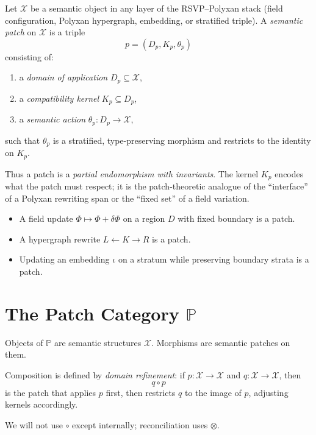\begin{definition}
Let $\mathcal{X}$ be a semantic object in any layer of the RSVP--Polyxan stack
(field configuration, Polyxan hypergraph, embedding, or stratified triple).
A \emph{semantic patch} on $\mathcal{X}$ is a triple
\[
p = (D_p, K_p, \theta_p)
\]
consisting of:
\begin{enumerate}
\item a \emph{domain of application} $D_p\subseteq\mathcal{X}$,
\item a \emph{compatibility kernel} $K_p\subseteq D_p$,
\item a \emph{semantic action} $\theta_p : D_p\to \mathcal{X}$,
\end{enumerate}
such that $\theta_p$ is a stratified, type-preserving morphism and restricts to the identity on $K_p$.
\end{definition}

Thus a patch is a \emph{partial endomorphism with invariants}.
The kernel $K_p$ encodes what the patch must respect; it is the patch-theoretic
analogue of the ``interface'' of a Polyxan rewriting span or the ``fixed set'' of a field variation.

\begin{example}
\hfill
\begin{itemize}
\item A field update $\Phi \mapsto \Phi + \delta\Phi$ on a region $D$ with fixed boundary is a patch.
\item A hypergraph rewrite $L \leftarrow K \to R$ is a patch.
\item Updating an embedding $\iota$ on a stratum while preserving boundary strata is a patch.
\end{itemize}
\end{example}

\section{The Patch Category \texorpdfstring{$\mathbb{P}$}{P}}

Objects of $\mathbb{P}$ are semantic structures $\mathcal{X}$.  
Morphisms are semantic patches on them.

Composition is defined by \emph{domain refinement}:
if $p : \mathcal{X}\to\mathcal{X}$ and $q : \mathcal{X}\to\mathcal{X}$,
then
\[
q\circ p
\]
is the patch that applies $p$ first, then restricts $q$ to the image of $p$,
adjusting kernels accordingly.

We will not use $\circ$ except internally; reconciliation uses $\otimes$.


